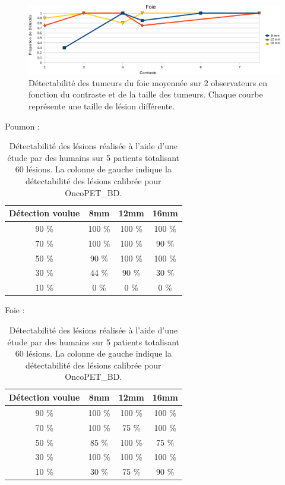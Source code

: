 \begin{figure}[h!]
\begin{center}
\includegraphics[width=15cm]{images/calibrationFoie_crop}
\end{center}
\caption[Détectabilité des tumeurs du foie en fonction du contraste et de la taille des tumeurs]{Détectabilité des tumeurs du foie moyennée sur 2 observateurs en fonction du contraste et de la taille des tumeurs. Chaque courbe représente une taille de lésion différente.} 
\label{fig:calibrationFoie}
\end{figure}




\begin{table}
\centering
Poumon :\\
\begin{tabular}{|c|c|c|c|}
 \hline
 Détection voulue & 	8mm & 	12mm & 	16mm \\
\hline
90 \%		  & 100 \%  & 100 \% & 100 \% \\
\hline
70 \%		  & 100 \%  & 100 \% & 90 \%\\
\hline
50 \%		  & 90 \%  & 100 \% & 100 \%\\
\hline
30 \%		  & 44 \%  & 90 \% & 30 \%\\
\hline
10 \% 		  & 0 \%  & 0 \% & 0 \%\\
\hline
\end{tabular}

\vspace{0.5cm}

Foie :\\
\begin{tabular}{|c|c|c|c|}
 \hline
 Détection voulue & 	8mm & 	12mm & 	16mm \\
\hline
90 \%		  & 100 \%  & 100 \% & 100 \% \\
\hline
70 \%		  & 100 \%  & 75 \% & 100 \%\\
\hline
50 \%		  & 85 \%  & 100 \% & 75 \%\\
\hline
30 \%		  & 100 \%  & 100 \% & 100 \%\\
\hline
10 \% 		  & 30 \%  & 75 \% & 90 \%\\
\hline
\end{tabular}
\caption[Détectabilité estimée des lésions en fonction du contraste et de leur diamètre]{Détectabilité des lésions réalisée à l'aide d'une étude par des humains sur 5 patients totalisant 60 lésions. La colonne de gauche indique la détectabilité des lésions calibrée pour OncoPET\_BD.}
\label{fig:detectabiliteVue}
\end{table}

